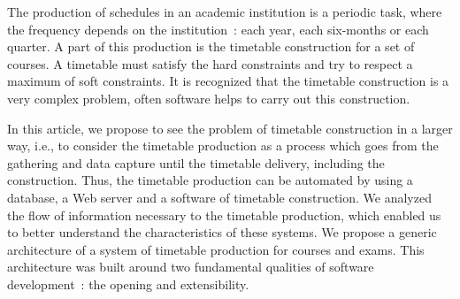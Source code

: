 The production of schedules in an academic institution is a
periodic task, where the frequency depends on the institution~:
each year, each six-months or each quarter. A part of this
production is the timetable construction for a set of courses. A
timetable must satisfy the hard constraints and try to respect a
maximum of soft constraints. It is recognized that the timetable
construction is a very complex problem, often software helps to
carry out this construction.

In this article, we propose to see the problem of timetable
construction in a larger way, i.e., to consider the timetable
production as a process which goes from the gathering and data
capture until the timetable delivery, including the construction.
Thus, the timetable production can be automated by using a
database, a Web server and a software of timetable construction.
We analyzed the flow of information necessary to the timetable
production, which enabled us to better understand the
characteristics of these systems. We propose a generic
architecture of a system of timetable production for courses and
exams. This architecture was built around two fundamental
qualities of software development~: the opening and extensibility.

